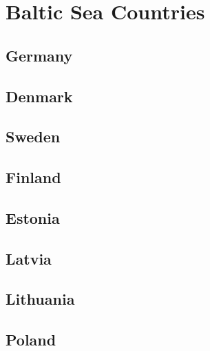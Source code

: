 \section{Baltic Sea Countries}

\subsection*{Germany}

\subsection*{Denmark}

\subsection*{Sweden}

\subsection*{Finland}

\subsection*{Estonia}

\subsection*{Latvia}

\subsection*{Lithuania}

\subsection*{Poland}
